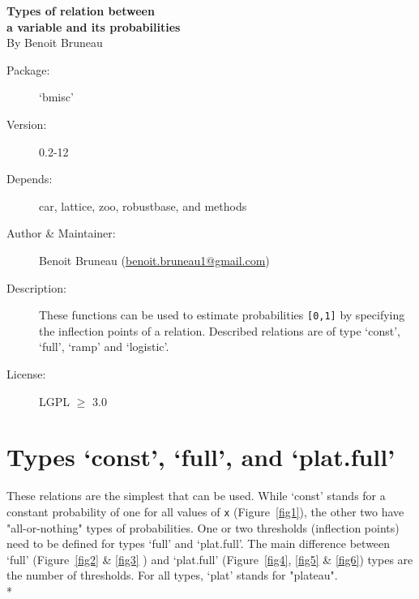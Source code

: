 \documentclass[letterpaper, 12pt]{article}
\begin{document}
\begin{titlepage}
\vspace*{3cm}
\begin{center}

\huge{\bf Types of relation between \\ a variable and its probabilities}\\

\vspace*{2cm}
\large{By Benoit Bruneau}
\end{center}
\vspace*{4cm}

\begin{description}
\item[Package:] `bmisc'
\item[Version:] 0.2-12
\item[Depends:] car, lattice, zoo, robustbase, and methods
\item[Author \& Maintainer:] Benoit Bruneau (\href{mailto:benoit.bruneau1@gmail.com}{benoit.bruneau1@gmail.com})
\item[Description:] These functions can be used to estimate probabilities \verb=[0,1]= by specifying the inflection points of a relation. Described relations are of type `const', `full', `ramp' and `logistic'.
\item[License:] LGPL $\geqslant$ 3.0
\end{description}


\vspace*{\fill;}


\end{titlepage}

\tableofcontents
\newpage

\section{Types `const', `full', and `plat.full'}
\noindent These relations are the simplest that can be used. While `const' stands for a constant probability of one for all 
values of \verb#x# (Figure~\ref{fig1}), the other two have "all-or-nothing" types of probabilities. One or two thresholds 
(inflection points) need to be defined for types `full' and `plat.full'. The main difference between `full'
(Figure~\ref{fig2} \& \ref{fig3} ) 
and `plat.full' (Figure~\ref{fig4}, \ref{fig5} \& \ref{fig6}) types are the number of thresholds. For all types, `plat' stands for "plateau".\\*
\end{document}
